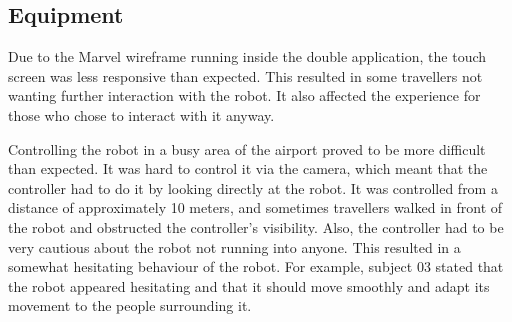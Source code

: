 \subsection{Equipment}
Due to the Marvel wireframe running inside the double application, the touch screen was less responsive than expected. This resulted in some travellers not wanting further interaction with the robot. It also affected the experience for those who chose to interact with it anyway.

Controlling the robot in a busy area of the airport proved to be more difficult than expected. It was hard to control it via the camera, which meant that the controller had to do it by looking directly at the robot. It was controlled from a distance of approximately 10 meters, and sometimes travellers walked in front of the robot and obstructed the controller's visibility. Also, the controller had to be very cautious about the robot not running into anyone. This resulted in a somewhat hesitating behaviour of the robot. For example, subject 03 stated that the robot appeared hesitating and that it should move smoothly and adapt its movement to the people surrounding it.